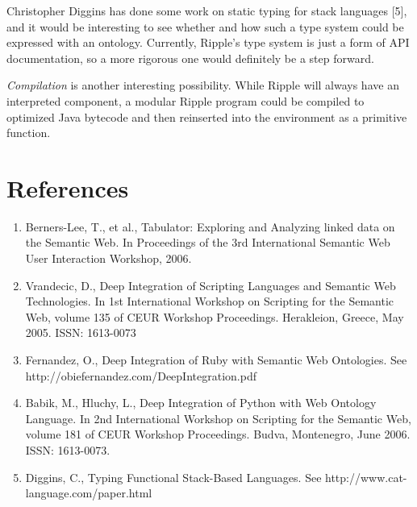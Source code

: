 \documentclass[runningheads]{llncs}
\begin{document}
Christopher Diggins has done some work on static typing for stack languages [5], and it would be interesting to see whether and how such a type system could be expressed with an ontology.  Currently, Ripple's type system is just a form of API documentation, so a more rigorous one would definitely be a step forward.

\textit{Compilation} is another interesting possibility.  While Ripple will always have an interpreted component, a modular Ripple program could be compiled to optimized Java bytecode and then reinserted into the environment as a primitive function.

\section*{References}
\begin{enumerate}
\item Berners-Lee, T., et al., Tabulator: Exploring and Analyzing linked data on the Semantic Web. In Proceedings of the 3rd International Semantic Web User Interaction Workshop, 2006.
\item Vrandecic, D., Deep Integration of Scripting Languages and Semantic Web Technologies. In 1st International Workshop on Scripting for the Semantic Web, volume 135 of CEUR Workshop Proceedings. Herakleion, Greece, May 2005. ISSN: 1613-0073
\item Fernandez, O., Deep Integration of Ruby with Semantic Web Ontologies. See http://obiefernandez.com/DeepIntegration.pdf
\item Babik, M., Hluchy, L., Deep Integration of Python with Web Ontology Language. In 2nd International Workshop on Scripting for the Semantic Web, volume 181 of CEUR Workshop Proceedings. Budva, Montenegro, June 2006. ISSN: 1613-0073.
\item Diggins, C., Typing Functional Stack-Based Languages.  See http://www.cat-language.com/paper.html
\end{enumerate}
\end{document}

